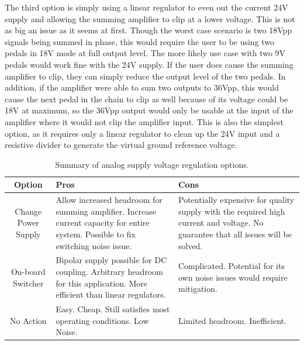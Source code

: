 	The third option is simply using a linear regulator to even out the current 24V supply and allowing the summing amplifier to clip at a lower voltage.  This is not as big an issue as it seems at first.  Though the worst case scenario is two 18Vpp signals being summed in phase, this would require the user to be using two pedals in 18V mode at full output level.  The more likely use case with two 9V pedals would work fine with the 24V supply.  If the user does cause the summing amplifier to clip, they can simply reduce the output level of the two pedals.  In addition, if the amplifier were able to sum two outputs to 36Vpp, this would cause the next pedal in the chain to clip as well because of its voltage could be 18V at maximum, so the 36Vpp output would only be usable at the input of the amplifier where it would not clip the amplifier input.  This is also the simplest option, as it requires only a linear regulator to clean up the 24V input and a resistive divider to generate the virtual ground reference voltage.  

	\begin{table}
	\begin{center}
	\begin{tabular}{|c|p{2in} p{2in}|}
	\hline
	Option & Pros & Cons \\
	\hline
	Change Power Supply 	& Allow increased headroom for summing amplifier.  Increase current capacity for entire system.  Possible to fix switching noise issue. 
								& Potentially expensive for quality supply with the required high current and voltage.  No guarantee that all issues will be solved. \\
	On-board Switcher 		& Bipolar supply possible for DC coupling.  Arbitrary headroom for this application.  More efficient than linear regulators. 	
								& Complicated.  Potential for its own noise issues would require mitigation. \\
	No Action 				& Easy.  Cheap.  Still satisfies most operating conditions. Low Noise.
								& Limited headroom.  Inefficient. \\
	\hline
	\end{tabular}
	\caption{Summary of analog supply voltage regulation options.}
	\label{tab:pwrsupplyproscons}
	\end{center}
	\end{table}

